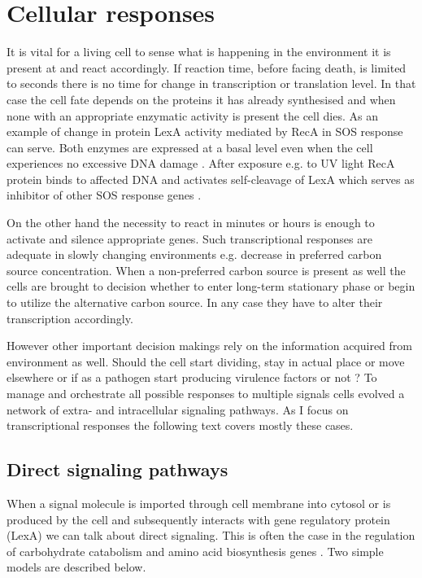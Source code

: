 \section{Cellular responses}
It is vital for a living cell to sense what is happening in the environment it is present at and react accordingly.
If reaction time, before facing death, is limited to seconds there is no time for change in transcription or translation level.
In that case the cell fate depends on the proteins it has already synthesised and when none with an appropriate enzymatic activity is present the cell dies.
As an example of change in protein LexA activity mediated by RecA in SOS response can serve.
Both enzymes are expressed at a basal level even when the cell experiences no excessive DNA damage \cite{brent1980lexa, casaregola1982quantitative}.
After exposure e.g. to UV light RecA protein binds to affected DNA and activates self-cleavage of LexA which serves as inhibitor of other SOS response genes \cite{giese2008reca}.

On the other hand the necessity to react in minutes or hours is enough to activate and silence appropriate genes.
Such transcriptional responses are adequate in slowly changing environments e.g. decrease in preferred carbon source concentration.
When a non-preferred carbon source is present as well the cells are brought to decision whether to enter long-term stationary phase or begin to utilize the alternative carbon source.
In any case they have to alter their transcription accordingly.

However other important decision makings rely on the information acquired from environment as well.
Should the cell start dividing, stay in actual place or move elsewhere or if as a pathogen start producing virulence factors or not \cite{gottesman2003proteolysis, sourjik2012responding, cui2018novel}?
To manage and orchestrate all possible responses to multiple signals cells evolved a network of extra- and intracellular signaling pathways.
As I focus on transcriptional responses the following text covers mostly these cases.

\subsection{Direct signaling pathways}
When a signal molecule is imported through cell membrane into cytosol or is produced by the cell and subsequently interacts with gene regulatory protein (LexA) we can talk about direct signaling.
This is often the case in the regulation of carbohydrate catabolism and amino acid biosynthesis genes \cite{charlier1992arginine, weickert1992isorepressor, pittard1996various, wheatley2013structural}.
Two simple models are described below.

